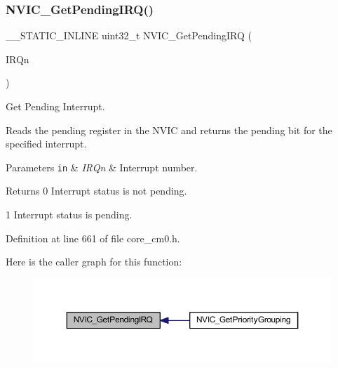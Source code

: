 \subsubsection{\texorpdfstring{N\+V\+I\+C\+\_\+\+Get\+Pending\+I\+R\+Q()}{NVIC\_GetPendingIRQ()}}
{\footnotesize\ttfamily \+\_\+\+\_\+\+S\+T\+A\+T\+I\+C\+\_\+\+I\+N\+L\+I\+NE uint32\+\_\+t N\+V\+I\+C\+\_\+\+Get\+Pending\+I\+RQ (\begin{DoxyParamCaption}\item[{\hyperlink{group___configuration__section__for___c_m_s_i_s_gac3af4a32370fb28c4ade8bf2add80251}{I\+R\+Qn\+\_\+\+Type}}]{I\+R\+Qn }\end{DoxyParamCaption})}



Get Pending Interrupt. 

Reads the pending register in the N\+V\+IC and returns the pending bit for the specified interrupt. 
\begin{DoxyParams}[1]{Parameters}
\mbox{\tt in}  & {\em I\+R\+Qn} & Interrupt number. \\
\hline
\end{DoxyParams}
\begin{DoxyReturn}{Returns}
0 Interrupt status is not pending. 

1 Interrupt status is pending. 
\end{DoxyReturn}


Definition at line 661 of file core\+\_\+cm0.\+h.

Here is the caller graph for this function\+:
\nopagebreak
\begin{figure}[H]
\begin{center}
\leavevmode
\includegraphics[width=350pt]{group___c_m_s_i_s___core___n_v_i_c_functions_gafec8042db64c0f8ed432b6c8386a05d8_icgraph}
\end{center}
\end{figure}
\mbox{\label{group___c_m_s_i_s___core___n_v_i_c_functions_ga1cbaf8e6abd4aa4885828e7f24fcfeb4}} 
